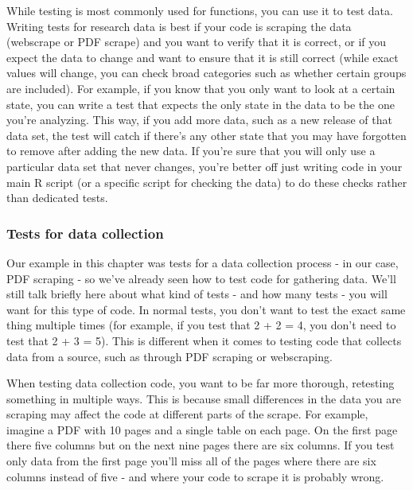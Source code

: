 \documentclass[
]{krantz}
\begin{document}
While testing is most commonly used for functions, you can use it to test data. Writing tests for research data is best if your code is scraping the data (webscrape or PDF scrape) and you want to verify that it is correct, or if you expect the data to change and want to ensure that it is still correct (while exact values will change, you can check broad categories such as whether certain groups are included). For example, if you know that you only want to look at a certain state, you can write a test that expects the only state in the data to be the one you're analyzing. This way, if you add more data, such as a new release of that data set, the test will catch if there's any other state that you may have forgotten to remove after adding the new data. If you're sure that you will only use a particular data set that never changes, you're better off just writing code in your main R script (or a specific script for checking the data) to do these checks rather than dedicated tests.

\hypertarget{tests-for-data-collection}{%
\subsubsection{Tests for data collection}\label{tests-for-data-collection}}

Our example in this chapter was tests for a data collection process - in our case, PDF scraping - so we've already seen how to test code for gathering data. We'll still talk briefly here about what kind of tests - and how many tests - you will want for this type of code. In normal tests, you don't want to test the exact same thing multiple times (for example, if you test that 2 + 2 = 4, you don't need to test that 2 + 3 = 5). This is different when it comes to testing code that collects data from a source, such as through PDF scraping or webscraping.

When testing data collection code, you want to be far more thorough, retesting something in multiple ways. This is because small differences in the data you are scraping may affect the code at different parts of the scrape. For example, imagine a PDF with 10 pages and a single table on each page. On the first page there five columns but on the next nine pages there are six columns. If you test only data from the first page you'll miss all of the pages where there are six columns instead of five - and where your code to scrape it is probably wrong.
\end{document}
